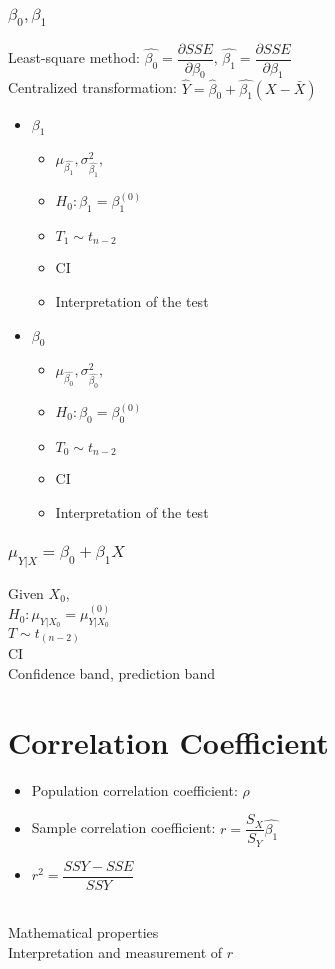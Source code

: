 \documentclass[paper=a4, fontsize=11pt]{scrartcl} %
\numberwithin{equation}{section} %
\numberwithin{figure}{section} %
\numberwithin{table}{section} %
\begin{document}
\subsubsection{$\beta_0, \beta_1$}
Least-square method: $\hat{\beta_0} = \dfrac{\partial SSE}{\partial \beta_0}$, $\hat{\beta_1} = \dfrac{\partial SSE}{\partial \beta_1}$
\\Centralized transformation: $\hat{Y} = \hat{\beta}_0 + \hat{\beta_1}(X - \bar{X})$\\
\begin{itemize}
	\item $\beta_1$
		\begin{itemize}
		\item $\mu_{\hat{\beta_1}}, \sigma^2_{\hat{\beta_1}},$
		\item $H_0: \beta_1 = \beta^{(0)}_1$
		\item $T_1 \sim t_{n-2}$
		\item CI
		\item Interpretation of the test
		\end{itemize}
	\item $\beta_0$
		\begin{itemize}
		\item $\mu_{\hat{\beta_0}}, \sigma^2_{\hat{\beta_0}},$
		\item $H_0: \beta_0 = \beta^{(0)}_0$
		\item $T_0 \sim t_{n-2}$
		\item CI
		\item Interpretation of the test
		\end{itemize}
\end{itemize}

\subsubsection{$\mu_{Y|X} = \beta_0 + \beta_1X$}
Given $X_0$, 
\\$H_0: \mu_{Y|X_0} = \mu^{(0)}_{Y|X_0}$
\\$T \sim t_{(n-2)}$
\\CI
\\Confidence band, prediction band



\section{Correlation Coefficient}
\begin{itemize}\\
   \item Population correlation coefficient: $\rho$
   \item Sample correlation coefficient: $r = \dfrac{S_X}{S_Y}\hat{\beta_1}$	
   \item $r^2 = \dfrac{SSY-SSE}{SSY}$
   \end{itemize}
\\Mathematical properties
\\Interpretation and measurement of $r$
\end{document}
